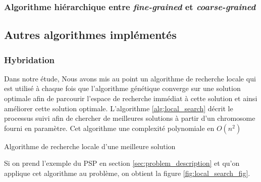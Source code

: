 	\subsubsection{Algorithme hiérarchique entre \emph{fine-grained} et \emph{coarse-grained}}
	
	\subsection{Autres algorithmes implémentés}
	
	\subsubsection{Hybridation}
	\hspace*{.5cm} Dans notre étude, Nous avons mis au point un algorithme de recherche locale qui est utilisé à chaque fois que l'algorithme génétique converge sur une solution optimale afin de parcourir l'espace de recherche immédiat à cette solution et ainsi améliorer cette solution optimale. L'algorithme \ref{alg:local_search} décrit le processus suivi afin de chercher de meilleures solutions à partir d'un chromosome fourni en paramètre. Cet algorithme une complexité polynomiale en $O(n^{2})$ 
	\\
	\begin{algorithm}[H]
		\label{alg:local_search}
 		\caption{Algorithme de recherche locale d'une meilleure solution}
 		\BlankLine
	\end{algorithm}
	\vspace*{.5cm}
	Si on prend l'exemple du PSP en section \ref{sec:problem_description} et qu'on applique cet algorithme au problème, on obtient la figure \ref{fig:local_search_fig}.
	
